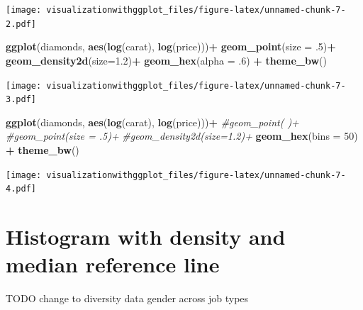 \documentclass[]{krantz}
\makeatletter
\newenvironment{Shaded}{\begin{snugshade}}{\end{snugshade}}
\newcommand{\KeywordTok}[1]{\textcolor[rgb]{0.13,0.29,0.53}{\textbf{#1}}}
\newcommand{\DataTypeTok}[1]{\textcolor[rgb]{0.13,0.29,0.53}{#1}}
\newcommand{\DecValTok}[1]{\textcolor[rgb]{0.00,0.00,0.81}{#1}}
\newcommand{\FloatTok}[1]{\textcolor[rgb]{0.00,0.00,0.81}{#1}}
\newcommand{\StringTok}[1]{\textcolor[rgb]{0.31,0.60,0.02}{#1}}
\newcommand{\CommentTok}[1]{\textcolor[rgb]{0.56,0.35,0.01}{\textit{#1}}}
\newcommand{\OperatorTok}[1]{\textcolor[rgb]{0.81,0.36,0.00}{\textbf{#1}}}
\newcommand{\NormalTok}[1]{#1}
\newenvironment{kframe}{%
\medskip{}
\setlength{\fboxsep}{.8em}
 \def\at@end@of@kframe{}%
 \ifinner\ifhmode%
  \def\at@end@of@kframe{\end{minipage}}%
  \begin{minipage}{\columnwidth}%
 \fi\fi%
 \def\FrameCommand##1{\hskip\@totalleftmargin \hskip-\fboxsep
 \colorbox{shadecolor}{##1}\hskip-\fboxsep
     \hskip-\linewidth \hskip-\@totalleftmargin \hskip\columnwidth}%
 \MakeFramed {\advance\hsize-\width
   \@totalleftmargin\z@ \linewidth\hsize
   \@setminipage}}%
 {\par\unskip\endMakeFramed%
 \at@end@of@kframe}
\renewenvironment{Shaded}{\begin{kframe}}{\end{kframe}}
\theoremstyle{definition}
\theoremstyle{definition}
\theoremstyle{definition}
\theoremstyle{remark}
\makeatother
\begin{document}
\texttt{[image: visualizationwithggplot\_files/figure-latex/unnamed-chunk-7-2.pdf]}

\begin{Shaded}
\begin{Highlighting}[]
\KeywordTok{ggplot}\NormalTok{(diamonds, }\KeywordTok{aes}\NormalTok{(}\KeywordTok{log}\NormalTok{(carat), }\KeywordTok{log}\NormalTok{(price)))}\OperatorTok{+}
\StringTok{  }\KeywordTok{geom_point}\NormalTok{(}\DataTypeTok{size =}\NormalTok{ .}\DecValTok{5}\NormalTok{)}\OperatorTok{+}\StringTok{ }
\StringTok{  }\KeywordTok{geom_density2d}\NormalTok{(}\DataTypeTok{size=}\FloatTok{1.2}\NormalTok{)}\OperatorTok{+}
\StringTok{  }\KeywordTok{geom_hex}\NormalTok{(}\DataTypeTok{alpha =}\NormalTok{ .}\DecValTok{6}\NormalTok{) }\OperatorTok{+}
\StringTok{  }\KeywordTok{theme_bw}\NormalTok{()}
\end{Highlighting}
\end{Shaded}

\texttt{[image: visualizationwithggplot\_files/figure-latex/unnamed-chunk-7-3.pdf]}

\begin{Shaded}
\begin{Highlighting}[]
\KeywordTok{ggplot}\NormalTok{(diamonds, }\KeywordTok{aes}\NormalTok{(}\KeywordTok{log}\NormalTok{(carat), }\KeywordTok{log}\NormalTok{(price)))}\OperatorTok{+}
\StringTok{  }\CommentTok{#geom_point( )+}
\StringTok{  }\CommentTok{#geom_point(size = .5)+ }
\StringTok{  }\CommentTok{#geom_density2d(size=1.2)+}
\StringTok{  }\KeywordTok{geom_hex}\NormalTok{(}\DataTypeTok{bins =} \DecValTok{50}\NormalTok{) }\OperatorTok{+}
\StringTok{  }\KeywordTok{theme_bw}\NormalTok{()}
\end{Highlighting}
\end{Shaded}

\texttt{[image: visualizationwithggplot\_files/figure-latex/unnamed-chunk-7-4.pdf]}

\section{Histogram with density and median reference
line}\label{histogram-with-density-and-median-reference-line}

TODO change to diversity data gender across job types
\end{document}
